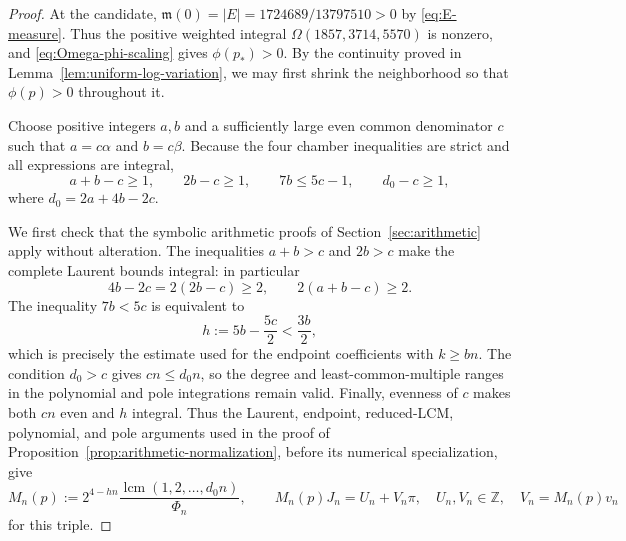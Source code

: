 \documentclass[11pt,reqno,letterpaper]{amsart}
\numberwithin{equation}{section}
\theoremstyle{definition}
\theoremstyle{remark}
\DeclareMathOperator{\lcm}{lcm}
\begin{document}
\begin{proof}
At the candidate,
\(\mathfrak m(0)=|E|=1724689/13797510>0\) by
\eqref{eq:E-measure}.  Thus the positive weighted integral
\(\Omega(1857,3714,5570)\) is nonzero, and
\eqref{eq:Omega-phi-scaling} gives \(\phi(p_*)>0\).  By the continuity proved in
Lemma~\ref{lem:uniform-log-variation}, we may first shrink the
neighborhood so that \(\phi(p)>0\) throughout it.

Choose positive integers \(a,b\) and a sufficiently large even common
denominator \(c\) such that \(a=c\alpha\) and \(b=c\beta\).  Because the
four chamber inequalities are strict and all expressions are integral,
\begin{equation}\label{eq:general-integer-margins}
 a+b-c\geq1,\qquad 2b-c\geq1,\qquad
 7b\leq5c-1,\qquad d_0-c\geq1,
\end{equation}
where \(d_0=2a+4b-2c\).

We first check that the symbolic arithmetic proofs of
Section~\ref{sec:arithmetic} apply without alteration.  The inequalities
\(a+b>c\) and \(2b>c\) make the complete Laurent bounds integral: in
particular
\[
 4b-2c=2(2b-c)\geq2,\qquad
 2(a+b-c)\geq2.
\]
The inequality \(7b<5c\) is equivalent to
\[
 h:=5b-\frac{5c}{2}<\frac{3b}{2},
\]
which is precisely the estimate used for the endpoint coefficients with
\(k\geq bn\).  The condition \(d_0>c\) gives
\(cn\leq d_0n\), so the degree and least-common-multiple ranges in the
polynomial and pole integrations remain valid.  Finally, evenness of
\(c\) makes both \(cn\) even and \(h\) integral.  Thus the Laurent,
endpoint, reduced-LCM, polynomial, and pole arguments used in the proof
of Proposition~\ref{prop:arithmetic-normalization}, before its numerical
specialization, give
\begin{equation}\label{eq:general-arithmetic-multiplier}
 M_n(p):=2^{4-hn}
 \frac{\lcm(1,2,\ldots,d_0n)}{\Phi_n},
 \qquad
 M_n(p)J_n=U_n+V_n\pi,\quad U_n,V_n\in\mathbb Z,
 \quad V_n=M_n(p)v_n
\end{equation}
for this triple.


\end{proof}
\end{document}
